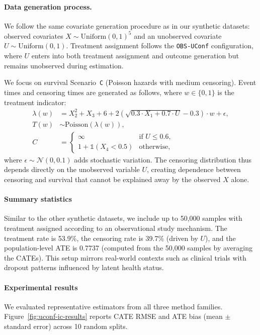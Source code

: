 \documentclass{article} %
\newcommand{\ind}{\mathds{1}}
\begin{document}
\paragraph{Data generation process.}
We follow the same covariate generation procedure as in our synthetic datasets: observed covariates $X \sim \text{Uniform}(0,1)^5$ and an unobserved covariate $U \sim \text{Uniform}(0,1)$. 
Treatment assignment follows the \texttt{OBS-UConf} configuration, where $U$ enters into both treatment assignment and outcome generation but remains unobserved during estimation. 

We focus on survival Scenario~\texttt{C} (Poisson hazards with medium censoring). Event times and censoring times are generated as follows, where $w \in \{0,1\}$ is the treatment indicator:
\begin{align}
    \lambda(w) &= X_2^2 + X_3 + 6 + 2\left(\sqrt{0.3 \cdot X_1 + 0.7 \cdot U} - 0.3\right) \cdot w + \epsilon, \\
    T(w) &\sim \text{Poisson}(\lambda(w)), \\
    C &= 
    \begin{cases} 
      \infty & \text{if } U \leq 0.6, \\[0.5em]
      1 + \ind(X_{4} < 0.5) & \text{otherwise},
    \end{cases}
\end{align}
where $\epsilon \sim \mathcal{N}(0,0.1)$ adds stochastic variation. 
The censoring distribution thus depends directly on the unobserved variable $U$, creating dependence between censoring and survival that cannot be explained away by the observed $X$ alone. 

\paragraph{Summary statistics}
Similar to the other synthetic datasets, we include up to 50{,}000 samples with treatment assigned according to an observational study mechanism. 
The treatment rate is 53.9\%, the censoring rate is 39.7\% (driven by $U$), and the population-level ATE is 0.7737 (computed from the 50,000 samples by averaging the CATEs). 
This setup mirrors real-world contexts such as clinical trials with dropout patterns influenced by latent health status.

\paragraph{Experimental results}
We evaluated representative estimators from all three method families. 
Figure~\ref{fig:uconf-ic-results} reports CATE RMSE and ATE bias (mean $\pm$ standard error) across 10 random splits. 
\end{document}
